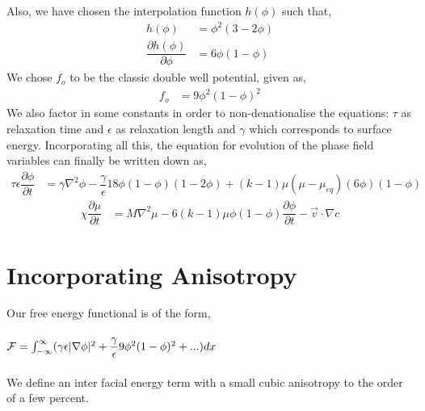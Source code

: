 \documentclass[12pt,a4paper]{report}
\begin{document}
Also, we have chosen the interpolation function $h(\phi)$ such that,
\begin{align}
	h(\phi) &= \phi^2\left(3 - 2 \phi\right) \\
	\dfrac{\partial h(\phi)}{\partial \phi} &= 6\phi\left(1-\phi\right)
	\label{interpolation functions}
\end{align}
We chose $f_o$ to be the classic double well potential, given as,
\begin{align}
	f_o &= 9\phi^2\left(1-\phi\right)^2
\end{align}
We also factor in some constants in order to non-denationalise the equations: $\tau$ as relaxation
time and $\epsilon$ as relaxation length and $\gamma$ which corresponds to surface energy.
Incorporating all this, the equation for evolution of the phase field variables 
can finally be written down as,
\begin{align}
\tau\epsilon\dfrac{\partial\phi}{\partial t} &= \gamma\nabla^{2}\phi -\dfrac{\gamma}{\epsilon}18\phi(1-\phi)(1-2\phi)
					+(k - 1)\mu\left(\mu-\mu_{eq}\right)(6\phi)\left(1-\phi\right)
\label{phi_evolution}
\end{align}
\begin{align}
		\chi \dfrac{\partial \mu}{\partial t} &=  M\nabla^2\mu 
	- 6\left(k-1\right)\mu\phi\left(1-\phi\right)\dfrac{\partial\phi}{\partial t}- \vec{v}\cdot\nabla c
\label{mu_evolution}
\end{align}
\section{Incorporating Anisotropy}
Our free energy functional is of the form,\\
 \\
${\cal F} = \int_{-\infty}^{\infty}(\gamma\epsilon|\nabla\phi|^2 + \dfrac{\gamma}{\epsilon}9\phi^2(1-\phi)^2 + ...)dx$\\
 \\
We define an inter facial energy term with a small cubic anisotropy 
to the order of a few percent.\\
\end{document}
